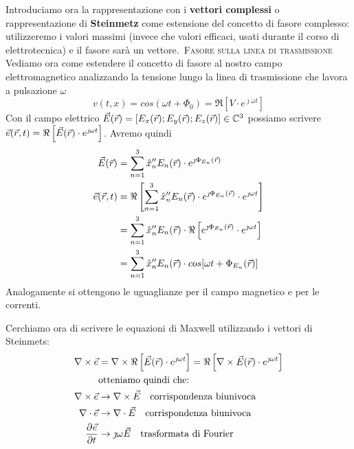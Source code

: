 Introduciamo ora la rappresentazione con i \textbf{vettori complessi} o rappresentazione di \textbf{Steinmetz}
come estensione del concetto di fasore complesso: utilizzeremo i valori massimi (invece che valori efficaci,
usati durante il corso di elettrotecnica) e il fasore sarà un vettore.\
\textsc{Fasore sulla linea di trasmissione}\\
Vediamo ora come estendere il concetto di fasore al nostro campo elettromagnetico analizzando
la tensione lungo la linea di trasmissione che lavora a pulsazione $\omega$
\begin{equation}
  v(t,x) = cos(\omega t + \Phi_0) = \Re\left[V \cdot e^{\jmath \omega t}\right]
\end{equation}
Con il campo elettrico $\vec{E}(\vec{r}) = \left[E_x(\vec{r});E_y(\vec{r});E_z(\vec{r})\right] \in \mathbb{C}^3$ possiamo
scrivere $\vec{e}(\vec{r},t) = \Re\left[\vec{E}(\vec{r})\cdot e^{\jmath \omega t}\right]$. Avremo quindi
\begin{equation}\begin{split}
  \vec{E}(\vec{r}) &= \sum\limits_{n=1}^3 \hat{x}_n^{\prime\prime} E_n(\vec{r})\cdot e^{\jmath \Phi_{E_n}(\vec{r})} \\
  \vec{e}(\vec{r},t) &= \Re\left[\sum\limits_{n=1}^3 \hat{x}_n^{\prime\prime} E_n(\vec{r})\cdot e^{\jmath \Phi_{E_n}(\vec{r})}\cdot e^{\jmath \omega t}\right]\\
  &=\sum\limits_{n=1}^3 \hat{x}_n^{\prime\prime} E_n(\vec{r})\cdot \Re\left[e^{\jmath \Phi_{E_n}(\vec{r})}\cdot e^{\jmath \omega t}\right]\\
  &=\sum\limits_{n=1}^3 \hat{x}_n^{\prime\prime} E_n(\vec{r})\cdot cos[\omega t + \Phi_{E_n}(\vec{r})]
\end{split}\end{equation}
Analogamente si ottengono le uguaglianze per il campo magnetico e per le correnti.

Cerchiamo ora di scrivere le equazioni di Maxwell utilizzando i vettori di Steinmets:
\begin{equation}\begin{split}
  \nabla\times \vec{e} &= \nabla\times \Re\left[\vec{E}(\vec{r}) \cdot e^{\jmath\omega t}\right] = \Re\left[\nabla\times\vec{E}(\vec{r}) \cdot e^{\jmath\omega t}\right]\\
  &\text{otteniamo quindi che:}\\
  \nabla\times\vec{e} &\rightarrow \nabla\times\vec{E} \quad \text{corrispondenza biunivoca} \\
  \nabla\cdot\vec{e} &\rightarrow \nabla\cdot\vec{E} \quad \text{corrispondenza biunivoca} \\
  \frac{\partial^{} {\vec{e}}}{\partial {t}^{}} & \rightarrow \jmath \omega \vec{E}\quad \text{trasformata di Fourier} \\
\end{split}\end{equation}

